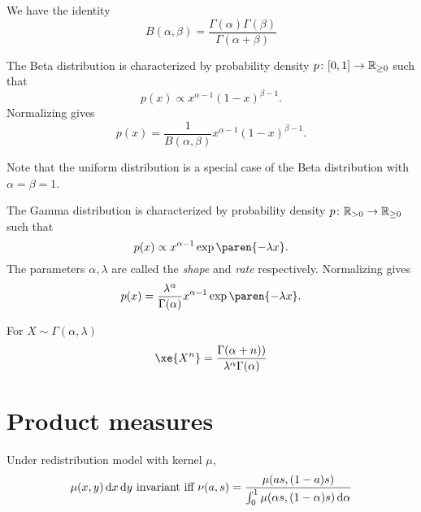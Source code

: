 \documentclass{article}
\begin{document}
We have the identity
\[
B(\alpha, \beta)
= \frac{\Gamma(\alpha) \Gamma(\beta)}{\Gamma(\alpha + \beta)}
\]

The Beta distribution is characterized by probability density $p \colon [0, 1] \to \mathbb{R}_{\ge 0}$ such that
\[
p(x) \propto x^{\alpha - 1} (1-x)^{\beta - 1}.
\]
Normalizing gives
\[
p(x) = \frac{1}{B(\alpha, \beta)} x^{\alpha - 1} (1-x)^{\beta - 1}.
\]

Note that the uniform distribution is a special case of the Beta distribution with $\alpha = \beta = 1$.


The Gamma distribution is characterized by probability density $p \colon \mathbb{R}_{>0} \to \mathbb{R}_{\ge 0}$ such that
\[
p(x) \propto x^{\alpha - 1} \exp\paren{-\lambda x}.
\]
The parameters $\alpha, \lambda$ are called the \emph{shape} and \emph{rate} respectively. Normalizing gives
\[
p(x) = \frac{\lambda^{\alpha}}{\Gamma(\alpha)} x^{\alpha - 1} \exp\paren{-\lambda x}.
\]

For $X \sim \Gamma(\alpha, \lambda)$
\[
\xe{X^n}
= \frac{\Gamma(\alpha + n))}{\lambda^{\alpha} \Gamma(\alpha)}
\]



\section{Product measures}

Under redistribution model with kernel $\mu$,
\[
\mu(x, y) \mathop{}\!\mathrm{d} x \mathop{}\!\mathrm{d} y  \text{ invariant iff }
\nu(a, s) = \frac{ \mu(as, (1-a)s) }{\int_0^1 \mu(\alpha s, (1-\alpha)s) \mathop{}\!\mathrm{d} \alpha}
\]
\end{document}
